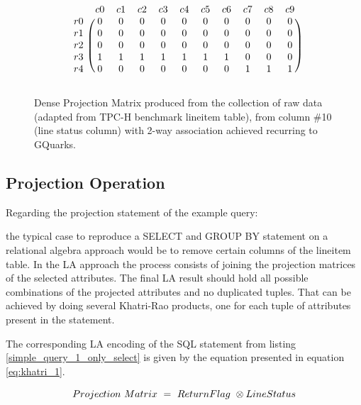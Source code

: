\begin{figure}[H]
\centering
\caption{Dense Projection Matrix produced from the collection of raw data (adapted from TPC-H benchmark lineitem table), from column \#10 (line status column) with 2-way association achieved recurring to GQuarks.}
\[
\begin{blockarray}{ccccccccccc}
	&	c0	&	c1	&	c2	&	c3	&	c4	&	c5	&	c6	&	c7	&	c8	&	c9	\\
\begin{block}{c(cccccccccc)}
r0	&	0	&	0	&	0	&	0	&	0	&	0	&	0	&	0	&	0	&	0	\\
r1	&	0	&	0	&	0	&	0	&	0	&	0	&	0	&	0	&	0	&	0	\\
r2	&	0	&	0	&	0	&	0	&	0	&	0	&	0	&	0	&	0	&	0	\\
r3	&	1	&	1	&	1	&	1	&	1	&	1	&	1	&	0	&	0	&	0	\\
r4	&	0	&	0	&	0	&	0	&	0	&	0	&	0	&	1	&	1	&	1	\\
\end{block}
\end{blockarray}
\]
\label{fig:example_matrix_10}
\end{figure}
    
    \subsection{Projection Operation}

Regarding the projection statement of the example query:

 the typical case to reproduce a SELECT and GROUP BY statement on a relational algebra approach would be to remove certain columns of the lineitem table. 
 In the LA approach the process consists of joining the projection matrices of the selected attributes. 
 The final LA result should hold all possible combinations
of the projected attributes and no duplicated tuples. That can be achieved by doing several Khatri-Rao products, one for each tuple of attributes present in the statement.\par 
The corresponding LA encoding of the SQL statement from listing \ref{simple_query_1_only_select} is given by the equation presented in equation \ref{eq:khatri_1}.
 
\begin{equation}
\centering
Projection\ Matrix\ =\ ReturnFlag\ \otimes LineStatus
\label{eq:khatri_1}
\end{equation}

